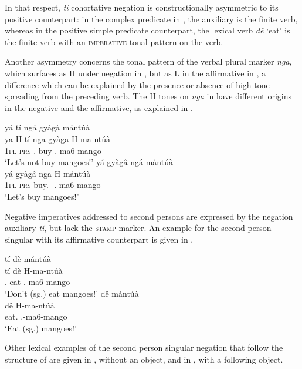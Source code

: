 In that respect, {\itshape tí} cohortative negation is constructionally asymmetric to its positive counterpart: in the complex predicate in , the auxiliary is the finite verb, whereas in the positive simple predicate counterpart, the lexical verb {\itshape dê} `eat' is the finite verb with an \textsc{imperative} tonal pattern on the verb.

Another asymmetry concerns the tonal pattern of the verbal plural marker {\itshape nga}, which surfaces as H under negation in , but as L in the affirmative in , a difference which can be explained by the presence or absence of high tone spreading from the preceding verb. The H tones on {\itshape nga} in   have different origins in the negative and the affirmative, as explained in .

\ea\label{ti2}
\ea \label{ti2a}
  \glll  yá tí ngá gyàgà mántúà \\
        ya-H tí nga gyàga H-ma-ntúà \\
           1\textsc{pl}-\textsc{prs} {\NEG}.{\R} {\PL} buy {\OBJ}.{\LINK}-ma6-mango\\
    \trans `Let's not buy mangoes!'
\ex\label{ti2b}
  \glll  yá gyàgâ ngá màntúà \\
        yá gyàgâ nga-H mántúà \\
           1\textsc{pl}-\textsc{prs} buy.{\IMP} {\PL}-{\OBJ}.{\LINK} ma6-mango\\
    \trans `Let's buy mangoes!'
\z
\z








Negative imperatives addressed to second persons are expressed by the negation auxiliary {\itshape tí}, but lack the \textsc{stamp} marker.  An example for the second person singular with its affirmative counterpart is given in .

\ea\label{ti3}
\ea \label{ti3a}
  \glll   tí dè mántúà \\
          tí dè H-ma-ntúà  \\
         {\NEG}.{\R} eat {\OBJ}.{\LINK}-ma6-mango\\
    \trans `Don't (sg.) eat mangoes!'
\ex\label{ti3b}
  \glll   dê mántúà \\
          dê H-ma-ntúà  \\
         eat.{\IMP} {\OBJ}.{\LINK}-ma6-mango\\
    \trans `Eat (sg.) mangoes!'
\z
\z

Other lexical examples of the second person singular negation that follow the structure of  are given in , without an object, and in , with a following object.

